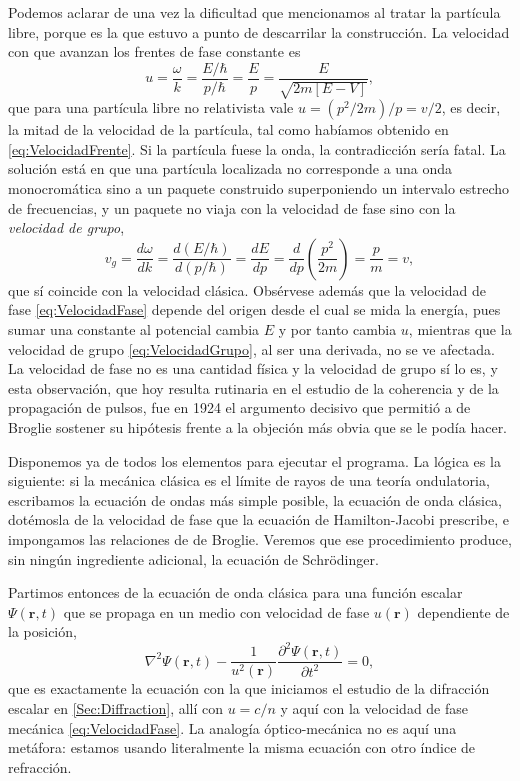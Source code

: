         Podemos aclarar de una vez la dificultad que mencionamos al tratar la partícula libre, porque es la que estuvo a punto de descarrilar la construcción. La velocidad con que avanzan los frentes de fase constante es
        \begin{equation}\label{eq:VelocidadFase}
            u = \frac{\omega}{k} = \frac{E/\hbar}{p/\hbar} = \frac{E}{p} = \frac{E}{\sqrt{2m\left[E-V\right]}},
        \end{equation}
        que para una partícula libre no relativista vale $u = (p^{2}/2m)/p = v/2$, es decir, la mitad de la velocidad de la partícula, tal como habíamos obtenido en \eqref{eq:VelocidadFrente}. Si la partícula fuese la onda, la contradicción sería fatal. La solución está en que una partícula localizada no corresponde a una onda monocromática sino a un paquete construido superponiendo un intervalo estrecho de frecuencias, y un paquete no viaja con la velocidad de fase sino con la \textit{velocidad de grupo},
        \begin{equation}\label{eq:VelocidadGrupo}
            v_{g} = \frac{d\omega}{dk} = \frac{d(E/\hbar)}{d(p/\hbar)} = \frac{dE}{dp} = \frac{d}{dp}\left(\frac{p^{2}}{2m}\right) = \frac{p}{m} = v,
        \end{equation}
        que sí coincide con la velocidad clásica. Obsérvese además que la velocidad de fase \eqref{eq:VelocidadFase} depende del origen desde el cual se mida la energía, pues sumar una constante al potencial cambia $E$ y por tanto cambia $u$, mientras que la velocidad de grupo \eqref{eq:VelocidadGrupo}, al ser una derivada, no se ve afectada. La velocidad de fase no es una cantidad física y la velocidad de grupo sí lo es, y esta observación, que hoy resulta rutinaria en el estudio de la coherencia y de la propagación de pulsos, fue en 1924 el argumento decisivo que permitió a de Broglie sostener su hipótesis frente a la objeción más obvia que se le podía hacer.

        Disponemos ya de todos los elementos para ejecutar el programa. La lógica es la siguiente: si la mecánica clásica es el límite de rayos de una teoría ondulatoria, escribamos la ecuación de ondas más simple posible, la ecuación de onda clásica, dotémosla de la velocidad de fase que la ecuación de Hamilton-Jacobi prescribe, e impongamos las relaciones de de Broglie. Veremos que ese procedimiento produce, sin ningún ingrediente adicional, la ecuación de Schrödinger.

        Partimos entonces de la ecuación de onda clásica para una función escalar $\Psi(\mathbf{r},t)$ que se propaga en un medio con velocidad de fase $u(\mathbf{r})$ dependiente de la posición,
        \begin{equation}\label{eq:OndaClasica}
            \nabla^{2}\Psi(\mathbf{r},t) - \frac{1}{u^{2}(\mathbf{r})}\frac{\partial^{2}\Psi(\mathbf{r},t)}{\partial t^{2}} = 0,
        \end{equation}
        que es exactamente la ecuación con la que iniciamos el estudio de la difracción escalar en \ref{Sec:Diffraction}, allí con $u = c/n$ y aquí con la velocidad de fase mecánica \eqref{eq:VelocidadFase}. La analogía óptico-mecánica no es aquí una metáfora: estamos usando literalmente la misma ecuación con otro índice de refracción.


